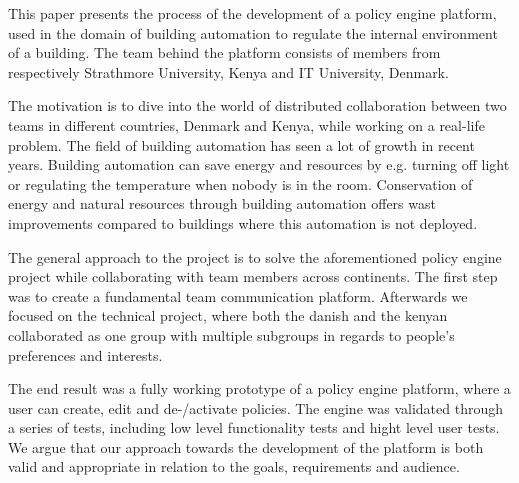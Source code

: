 This paper presents the process of the development of a policy engine platform, used in the domain of building automation to regulate the internal environment of a building. The team behind the platform consists of members from respectively Strathmore University, Kenya and IT University, Denmark. 

The motivation is to dive into the world of distributed collaboration between two teams in different countries, Denmark and Kenya, while working on a real-life problem. The field of building automation has seen a lot of growth in recent years. Building automation can save energy and resources by e.g. turning off light or regulating the temperature when nobody is in the room. Conservation of energy and natural resources through building automation offers wast improvements compared to buildings where this automation is not deployed.

The general approach to the project is to solve the aforementioned policy engine project while collaborating with team members across continents. The first step was to create a fundamental team communication platform. Afterwards we focused on the technical project, where both the danish and the kenyan collaborated as one group with multiple subgroups in regards to people's preferences and interests.

The end result was a fully working prototype of a policy engine platform, where a user can create, edit and de-/activate policies. The engine was validated through a series of tests, including low level functionality tests and hight level user tests. We argue that our approach towards the development of the platform is both valid and appropriate in relation to the goals, requirements and audience.